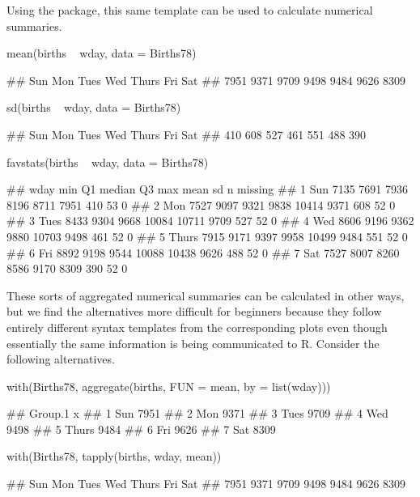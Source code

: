\noindent
Using the  package, this same template can be used to
calculate numerical summaries.

\begin{Schunk}
\begin{Sinput}
mean(births ~ wday, data = Births78)
\end{Sinput}
\begin{Soutput}
##   Sun   Mon  Tues   Wed Thurs   Fri   Sat 
##  7951  9371  9709  9498  9484  9626  8309
\end{Soutput}
\begin{Sinput}
sd(births ~ wday, data = Births78)
\end{Sinput}
\begin{Soutput}
##   Sun   Mon  Tues   Wed Thurs   Fri   Sat 
##   410   608   527   461   551   488   390
\end{Soutput}
\begin{Sinput}
favstats(births ~ wday, data = Births78)
\end{Sinput}
\begin{Soutput}
##    wday  min   Q1 median    Q3   max mean  sd  n missing
## 1   Sun 7135 7691   7936  8196  8711 7951 410 53       0
## 2   Mon 7527 9097   9321  9838 10414 9371 608 52       0
## 3  Tues 8433 9304   9668 10084 10711 9709 527 52       0
## 4   Wed 8606 9196   9362  9880 10703 9498 461 52       0
## 5 Thurs 7915 9171   9397  9958 10499 9484 551 52       0
## 6   Fri 8892 9198   9544 10088 10438 9626 488 52       0
## 7   Sat 7527 8007   8260  8586  9170 8309 390 52       0
\end{Soutput}
\end{Schunk}

\noindent
These sorts of aggregated numerical summaries can be calculated in other
ways, but we find the alternatives more difficult for beginners because
they follow entirely different syntax templates from the corresponding
plots even though essentially the same information is being communicated
to R. Consider the following alternatives.

\begin{Schunk}
\begin{Sinput}
with(Births78, aggregate(births, FUN = mean, by = list(wday)))
\end{Sinput}
\begin{Soutput}
##   Group.1    x
## 1     Sun 7951
## 2     Mon 9371
## 3    Tues 9709
## 4     Wed 9498
## 5   Thurs 9484
## 6     Fri 9626
## 7     Sat 8309
\end{Soutput}
\begin{Sinput}
with(Births78, tapply(births, wday, mean))
\end{Sinput}
\begin{Soutput}
##   Sun   Mon  Tues   Wed Thurs   Fri   Sat 
##  7951  9371  9709  9498  9484  9626  8309
\end{Soutput}
\end{Schunk}

